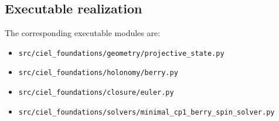 \subsection{Executable realization}
The corresponding executable modules are:
\begin{itemize}
  \item \texttt{src/ciel\_foundations/geometry/projective\_state.py}
  \item \texttt{src/ciel\_foundations/holonomy/berry.py}
  \item \texttt{src/ciel\_foundations/closure/euler.py}
  \item \texttt{src/ciel\_foundations/solvers/minimal\_cp1\_berry\_spin\_solver.py}
\end{itemize}
